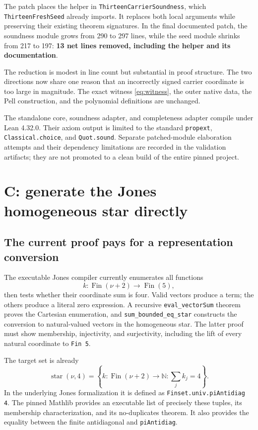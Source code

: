 \documentclass[11pt,letterpaper]{article}
\newcommand{\code}[1]{{\small\nolinkurl{#1}}}
\begin{document}
The patch places the helper in \code{ThirteenCarrierSoundness}, which \code{ThirteenFreshSeed} already imports. It replaces both local arguments while preserving their existing theorem signatures. In the final documented patch, the soundness module grows from 290 to 297 lines, while the seed module shrinks from 217 to 197: \textbf{13 net lines removed, including the helper and its documentation}.

The reduction is modest in line count but substantial in proof structure. The two directions now share one reason that an incorrectly signed carrier coordinate is too large in magnitude. The exact witness \eqref{eq:witness}, the outer native data, the Pell construction, and the polynomial definitions are unchanged.

The standalone core, soundness adapter, and completeness adapter compile under Lean 4.32.0. Their axiom output is limited to the standard \code{propext}, \code{Classical.choice}, and \code{Quot.sound}. Separate patched-module elaboration attempts and their dependency limitations are recorded in the validation artifacts; they are not promoted to a clean build of the entire pinned project.

\section{C: generate the Jones homogeneous star directly}
\label{sec:enumeration}

\subsection{The current proof pays for a representation conversion}

The executable Jones compiler currently enumerates all functions
\[
 k:\operatorname{Fin}(\nu+2)\to\operatorname{Fin}(5),
\]
then tests whether their coordinate sum is four. Valid vectors produce a term; the others produce a literal zero expression. A recursive \code{eval_vectorSum} theorem proves the Cartesian enumeration, and \code{sum_bounded_eq_star} constructs the conversion to natural-valued vectors in the homogeneous star. The latter proof must show membership, injectivity, and surjectivity, including the lift of every natural coordinate to \code{Fin 5}.\cite{execjones}

The target set is already
\[
 \operatorname{star}(\nu,4)
 =\left\{k:\operatorname{Fin}(\nu+2)\to\mathbb N:
                 \sum_j k_j=4\right\}.
\]
In the underlying Jones formalization it is defined as \code{Finset.univ.piAntidiag 4}. The pinned Mathlib provides an executable list of precisely these tuples, its membership characterization, and its no-duplicates theorem. It also provides the equality between the finite antidiagonal and \code{piAntidiag}.\cite{coding,antidiag,piantidiag}
\end{document}
